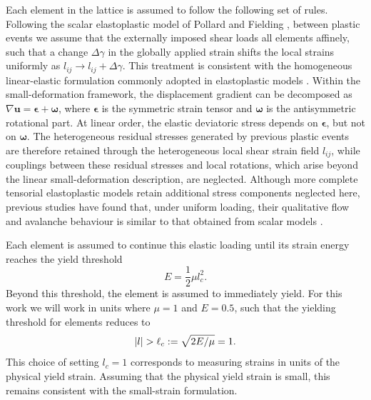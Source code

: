 Each element in the lattice is assumed to follow the following set of rules. Following the scalar elastoplastic model of Pollard and Fielding \cite{pollard_yielding_2022}, between plastic events we assume that the externally imposed shear loads all elements affinely, such that a change $\Delta\gamma$ in the globally applied strain shifts the local strains uniformly as $l_{ij}\to l_{ij}+\Delta\gamma$. This treatment is consistent with the homogeneous linear-elastic formulation commonly adopted in elastoplastic models \cite{nicolas_deformation_2018}. Within the small-deformation framework, the displacement gradient can be decomposed as $\nabla\bm{u}=\bm{\epsilon}+\bm{\omega}$, where $\bm{\epsilon}$ is the symmetric strain tensor and $\bm{\omega}$ is the antisymmetric rotational part. At linear order, the elastic deviatoric stress depends on $\bm{\epsilon}$, but not on $\bm{\omega}$. The heterogeneous residual stresses generated by previous plastic events are therefore retained through the heterogeneous local shear strain field $l_{ij}$, while couplings between these residual stresses and local rotations, which arise beyond the linear small-deformation description, are neglected. Although more complete tensorial elastoplastic models retain additional stress components neglected here, previous studies have found that, under uniform loading, their qualitative flow and avalanche behaviour is similar to that obtained from scalar models \cite{nicolas_deformation_2018,Budrikis2017,Nicolas2014}.

Each element is assumed to continue this elastic loading until its strain energy reaches the yield threshold
\[
    E=\frac{1}{2}\mu l_c^2.
\]
Beyond this threshold, the element is assumed to immediately yield. For this work we will work in units where $\mu=1$ and $E=0.5$, such that the yielding threshold for elements reduces to 
\[
    |l| > \ell_c := \sqrt{2E/\mu}=1.
\]
This choice of setting $l_c=1$ corresponds to measuring strains in units of the physical yield strain. Assuming that the physical yield strain is small, this remains consistent with the small-strain formulation.



